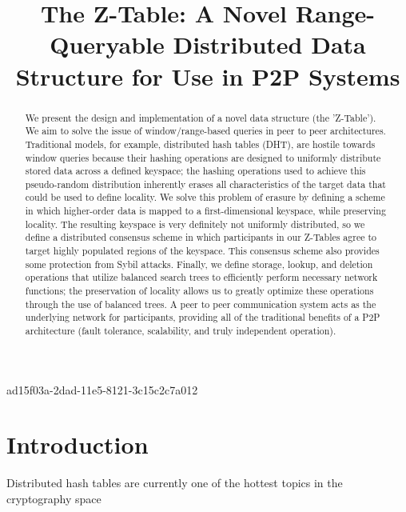 \documentclass[12pt]{article}
\title{The Z-Table: A Novel Range-Queryable Distributed Data Structure for Use in P2P Systems}
\begin{document}
\maketitle
ad15f03a-2dad-11e5-8121-3c15c2c7a012
\begin{abstract}
We present the design and implementation of a novel data structure (the 'Z-Table'). We aim to solve the issue of window/range-based queries in peer to peer architectures. Traditional models, for example,  distributed hash tables (DHT), are hostile towards window queries because their hashing operations are designed to uniformly distribute stored data across a defined keyspace; the hashing operations used to achieve this pseudo-random distribution inherently erases all characteristics of the target data that could be used to define locality. We solve this problem of erasure by defining a scheme in which higher-order data is mapped to a first-dimensional keyspace, while preserving locality. The resulting keyspace is very definitely not uniformly distributed, so we define a distributed consensus scheme in which participants in our Z-Tables agree to target highly populated regions of the keyspace. This consensus scheme also provides some protection from Sybil attacks. Finally, we define storage, lookup, and deletion operations that utilize balanced search trees to efficiently perform necessary network functions; the preservation of locality allows us to greatly optimize these operations through the use of balanced trees. A peer to peer communication system acts as the underlying network for participants, providing all of the traditional benefits of a P2P architecture (fault tolerance, scalability, and truly independent operation).
\end{abstract}


\newpage
\section{Introduction}
Distributed hash tables are currently one of the hottest topics in the cryptography space~\cite{Stoica:2001dj,Rowstron:2001ea,Ratnasamy:2001wn}

\printbibliography
\end{document}
